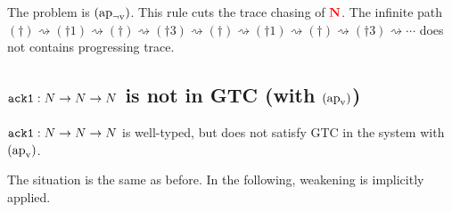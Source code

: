 \documentclass{article}
\newcommand{\bfColor}[2]{{\bf \color{#1}{#2}}}
\newcommand{\Rapv}{\hbox{$(\text{ap}_{\text{v}})$}}
\newcommand{\RapNv}{\hbox{$(\text{ap}_{\lnot\text{v}})$}}
\newcommand{\AckA}{{\tt ack1}}
\newcommand{\N}{N}
\newcommand{\rN}{\bfColor{red}{N}}
\newenvironment{claim}[1][Claim]{\begin{trivlist}
\item[\hskip \labelsep {\bfseries #1}]}{\end{trivlist}}
\begin{document}
The problem is $\RapNv$. This rule cuts the trace chasing of $\rN$. 
The infinite path $(\dagger)\rightsquigarrow(\dagger1)\rightsquigarrow(\dagger)\rightsquigarrow(\dagger3)\rightsquigarrow(\dagger)\rightsquigarrow(\dagger1)\rightsquigarrow(\dagger)\rightsquigarrow(\dagger3)\rightsquigarrow\cdots$ does not contains progressing trace. 

\subsection{$\AckA:\N\to\N\to\N$ is not in GTC (with $\Rapv$)}

\begin{claim}
  $\AckA:\N\to\N\to\N$ is well-typed, but does not satisfy GTC in the system with $\Rapv$.
\end{claim}

The situation is the same as before. In the following, weakening is implicitly applied. 
\end{document}
